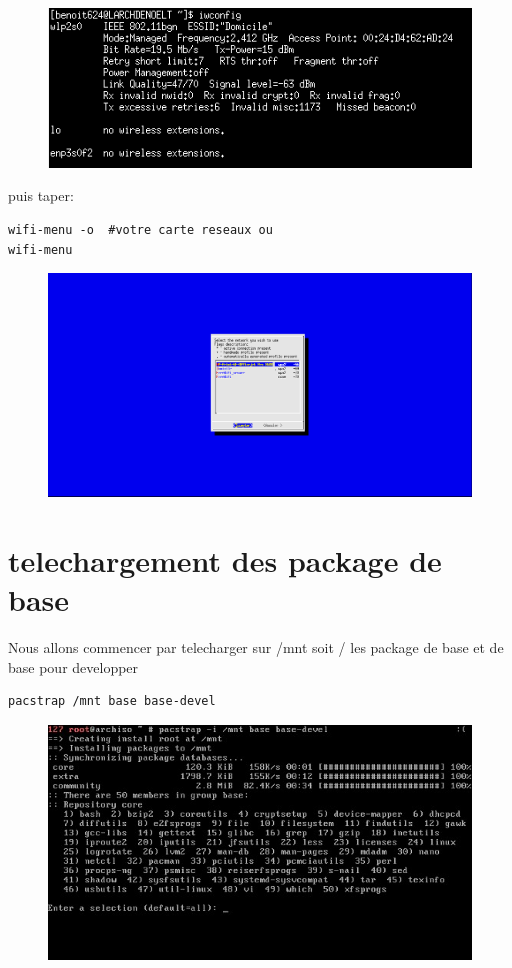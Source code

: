 \documentclass[a4paper]{book}
\begin{document}
\begin{figure}[h]
  \includegraphics[width=\textwidth]{images/iwconfig}
\end{figure}
puis taper:\\
\begin{lstlisting}
wifi-menu -o  #votre carte reseaux ou
wifi-menu
\end{lstlisting}

\begin{figure}[h]
  \includegraphics[width=\textwidth]{images/wifi-menu}
\end{figure}
\chapter{telechargement des package de base}
Nous allons commencer par telecharger sur /mnt soit / les package de base et de
base pour developper\\
\begin{lstlisting}
pacstrap /mnt base base-devel
\end{lstlisting}

\begin{figure}[h]
  \includegraphics[width=\textwidth]{images/pacstrapbase}
\end{figure}
\end{document}
